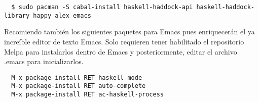 \documentclass[12pt, letter-paper]{article}
\begin{document}
\begin{lstlisting}
  $ sudo pacman -S cabal-install haskell-haddock-api haskell-haddock-library happy alex emacs 
\end{lstlisting}

Recomiendo también los siguientes paquetes para Emacs pues enriquecerán el ya increíble editor de texto Emacs. Solo requieren tener habilitado el repositorio Melpa para instalarlos dentro de Emacs y posteriormente, editar el archivo .emacs para inicializarlos.

\begin{lstlisting}
  M-x package-install RET haskell-mode
  M-x package-install RET auto-complete
  M-x package-install RET ac-haskell-process
\end{lstlisting}
\end{document}
